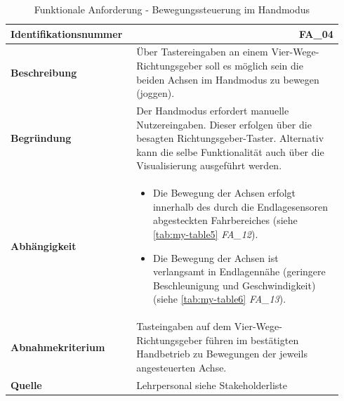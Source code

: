 \documentclass[../../../Bachelorarbeit.tex]{subfiles}
\begin{document}
\begin{table}[H]
    \centering
    \begin{tabular}{ p{0.34\linewidth}  p{0.6\linewidth} } 
        \hline
        \textbf{Identifikationsnummer}  & \multicolumn{1}{r}{FA\_04} \\ \hline
        \textbf{Beschreibung}           & Über Tastereingaben an einem Vier-Wege-Richtungsgeber soll es möglich sein die beiden Achsen im Handmodus zu bewegen (joggen). \\
        \textbf{Begründung}             & Der Handmodus erfordert manuelle Nutzereingaben. Dieser erfolgen über die besagten Richtungsgeber-Taster. Alternativ kann die selbe Funktionalität auch über die Visualisierung ausgeführt werden. \\
        \textbf{Abhängigkeit}           &   {\begin{itemize}[noitemsep,topsep=0pt,parsep=0pt,partopsep=0pt,leftmargin=*]
                                                \item Die Bewegung der Achsen erfolgt innerhalb des durch die Endlagesensoren abgesteckten Fahrbereiches (siehe \autoref{tab:my-table5} \textit{FA\_12}).
                                                \item Die Bewegung der Achsen ist verlangsamt in Endlagennähe (geringere Beschleunigung und Geschwindigkeit) (siehe \autoref{tab:my-table6} \textit{FA\_13}).
                                            \end{itemize}} \\
        \textbf{Abnahmekriterium}       & Tasteingaben auf dem Vier-Wege-Richtungsgeber führen im bestätigten Handbetrieb zu Bewegungen der jeweils angesteuerten Achse. \\
        \textbf{Quelle}                 & Lehrpersonal siehe Stakeholderliste \\ \hline
    \end{tabular}
    \caption[\acs{fa} - Bewegungssteuerung im Handmodus]{Funktionale Anforderung - Bewegungssteuerung im Handmodus}
    \label{tab:my-table2.6}
\end{table}
\end{document}
